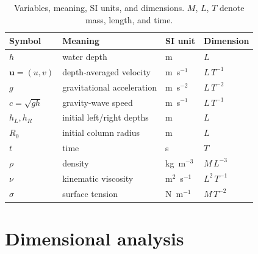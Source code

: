 ﻿\documentclass[11pt,a4paper]{article}
\newcommand{\bu}{\mathbf{u}}
\begin{document}
\begin{table}[H]
\centering
\caption{Variables, meaning, SI units, and dimensions.  $M$, $L$, $T$ denote
mass, length, and time.}
\label{tab:variables}
\small
\begin{tabular}{@{}llll@{}}
\toprule
Symbol & Meaning & SI unit & Dimension\\
\midrule
$h$ & water depth & m & $L$\\
$\bu=(u,v)$ & depth-averaged velocity & m~s$^{-1}$ & $L\,T^{-1}$\\
$g$ & gravitational acceleration & m~s$^{-2}$ & $L\,T^{-2}$\\
$c=\sqrt{gh}$ & gravity-wave speed & m~s$^{-1}$ & $L\,T^{-1}$\\
$h_L,h_R$ & initial left/right depths & m & $L$\\
$R_0$ & initial column radius & m & $L$\\
$t$ & time & s & $T$\\
$\rho$ & density & kg~m$^{-3}$ & $M\,L^{-3}$\\
$\nu$ & kinematic viscosity & m$^2$~s$^{-1}$ & $L^2\,T^{-1}$\\
$\sigma$ & surface tension & N~m$^{-1}$ & $M\,T^{-2}$\\
\bottomrule
\end{tabular}
\end{table}

\section{Dimensional analysis}
\label{sec:dim}
\end{document}
